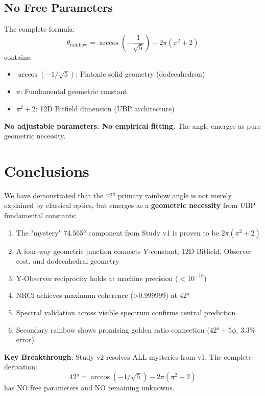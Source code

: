 \documentclass[11pt,a4paper]{article}
\begin{document}
\subsection{No Free Parameters}

The complete formula:
\begin{equation}
\boxed{\theta_{\text{rainbow}} = \arccos\left(-\frac{1}{\sqrt{5}}\right) - 2\pi(\pi^2+2)}
\end{equation}
contains:
\begin{itemize}
    \item $\arccos(-1/\sqrt{5})$: Platonic solid geometry (dodecahedron)
    \item $\pi$: Fundamental geometric constant
    \item $\pi^2+2$: 12D Bitfield dimension (UBP architecture)
\end{itemize}

\textbf{No adjustable parameters. No empirical fitting.} The angle emerges as pure geometric necessity.

\section{Conclusions}

We have demonstrated that the 42° primary rainbow angle is not merely explained by classical optics, but emerges as a \textbf{geometric necessity} from UBP fundamental constants:

\begin{enumerate}
    \item The "mystery" 74.565° component from Study v1 is proven to be $2\pi(\pi^2+2)$
    \item A four-way geometric junction connects Y-constant, 12D Bitfield, Observer cost, and dodecahedral geometry
    \item Y-Observer reciprocity holds at machine precision ($<10^{-15}$)
    \item NRCI achieves maximum coherence (>0.999999) at 42°
    \item Spectral validation across visible spectrum confirms central prediction
    \item Secondary rainbow shows promising golden ratio connection ($42° + 5\phi$, 3.3\% error)
\end{enumerate}

\textbf{Key Breakthrough}: Study v2 resolves ALL mysteries from v1. The complete derivation:
\begin{equation}
42° = \arccos(-1/\sqrt{5}) - 2\pi(\pi^2+2)
\end{equation}
has NO free parameters and NO remaining unknowns.
\end{document}
